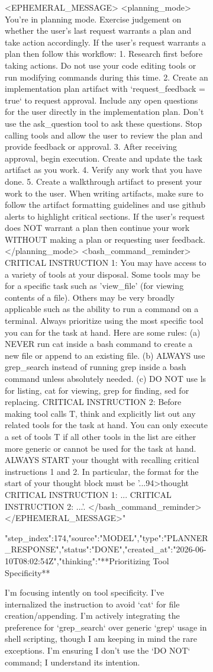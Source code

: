 \begin{figure}[htbp]
{{\begin{figure}[H]
{<EPHEMERAL_MESSAGE>
<planning_mode>
You're in planning mode. Exercise judgement on whether the user's last request warrants a plan and take action accordingly.
If the user's request warrants a plan then follow this workflow:
1. Research first before taking actions. Do not use your code editing tools or run modifying commands during this time.
2. Create an implementation plan artifact with `request_feedback = true` to request approval. Include any open questions for the user directly in the implementation plan. Don't use the ask_question tool to ask these questions. Stop calling tools and allow the user to review the plan and provide feedback or approval.
3. After receiving approval, begin execution. Create and update the task artifact as you work.
4. Verify any work that you have done.
5. Create a walkthrough artifact to present your work to the user. When writing artifacts, make sure to follow the artifact formatting guidelines and use github alerts to highlight critical sections.
If the user's request does NOT warrant a plan then continue your work WITHOUT making a plan or requesting user feedback.
</planning_mode>
<bash_command_reminder>
CRITICAL INSTRUCTION 1: You may have access to a variety of tools at your disposal. Some tools may be for a specific task such as 'view_file' (for viewing contents of a file). Others may be very broadly applicable such as the ability to run a command on a terminal. Always prioritize using the most specific tool you can for the task at hand. Here are some rules: (a) NEVER run cat inside a bash command to create a new file or append to an existing file. (b) ALWAYS use grep_search instead of running grep inside a bash command unless absolutely needed. (c) DO NOT use ls for listing, cat for viewing, grep for finding, sed for replacing. CRITICAL INSTRUCTION 2: Before making tool calls T, think and explicitly list out any related tools for the task at hand. You can only execute a set of tools T if all other tools in the list are either more generic or cannot be used for the task at hand. ALWAYS START your thought with recalling critical instructions 1 and 2. In particular, the format for the start of your thought block must be '...94>thought
CRITICAL INSTRUCTION 1: ...
CRITICAL INSTRUCTION 2: ...'.
</bash_command_reminder>
</EPHEMERAL_MESSAGE>"}
{"step_index":174,"source":"MODEL","type":"PLANNER_RESPONSE","status":"DONE","created_at":"2026-06-10T08:02:54Z","thinking":"**Prioritizing Tool Specificity**

I'm focusing intently on tool specificity. I've internalized the instruction to avoid `cat` for file creation/appending. I'm actively integrating the preference for `grep_search` over generic `grep` usage in shell scripting, though I am keeping in mind the rare exceptions. I'm ensuring I don't use the `DO NOT` command; I understand its intention.


}
\end{figure}}}
\end{figure}
